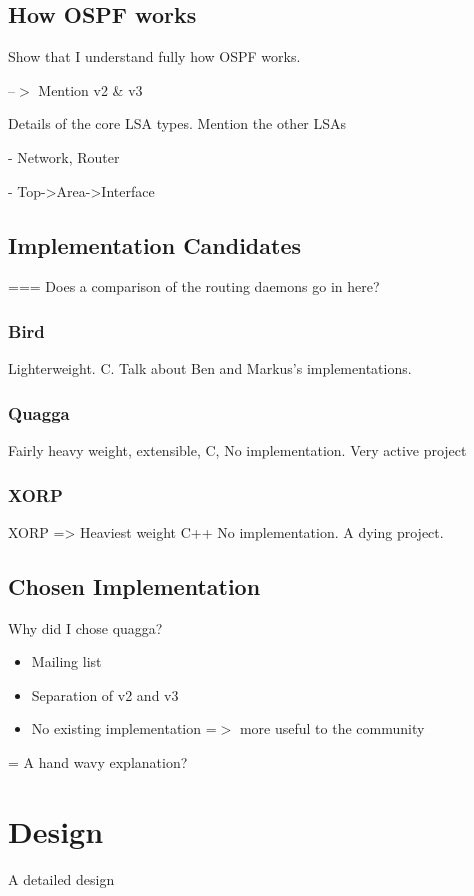 \documentclass[12pt]{report}
\begin{document}
\section{How OSPF works}
Show that I understand fully how OSPF works. 

--$>$ Mention v2 \& v3

Details of the core LSA types. Mention the other LSAs

- Network, Router 

- Top->Area->Interface

\section{Implementation Candidates}
=== Does a comparison of the routing daemons go in here?

\subsection{Bird}
Lighterweight. C. Talk about Ben and Markus's implementations.

\subsection{Quagga}
Fairly heavy weight, extensible, C, No implementation. Very active project

\subsection{XORP}
XORP => Heaviest weight C++ No implementation. A dying project.

\section{Chosen Implementation}
Why did I chose quagga?

\begin{itemize}
\item Mailing list
\item Separation of v2 and v3
\item No existing implementation =$>$ more useful to the community
\end{itemize}

= A hand wavy explanation?

\chapter{Design}
A detailed design
\end{document}
